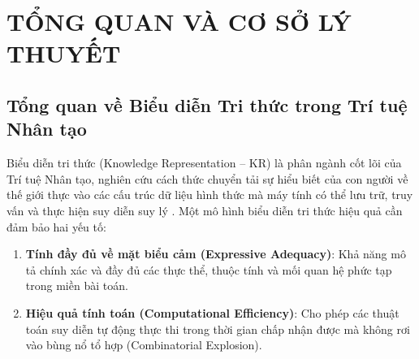 
\chapter{TỔNG QUAN VÀ CƠ SỞ LÝ THUYẾT}
\label{chap:overview}

\section{Tổng quan về Biểu diễn Tri thức trong Trí tuệ Nhân tạo}
Biểu diễn tri thức (Knowledge Representation -- KR) là phân ngành cốt lõi của Trí tuệ Nhân tạo, nghiên cứu cách thức chuyển tải sự hiểu biết của con người về thế giới thực vào các cấu trúc dữ liệu hình thức mà máy tính có thể lưu trữ, truy vấn và thực hiện suy diễn suy lý \cite{russell2020artificial, do2015bieudientrithuc}. Một mô hình biểu diễn tri thức hiệu quả cần đảm bảo hai yếu tố:
\begin{enumerate}
    \item \textbf{Tính đầy đủ về mặt biểu cảm (Expressive Adequacy)}: Khả năng mô tả chính xác và đầy đủ các thực thể, thuộc tính và mối quan hệ phức tạp trong miền bài toán.
    \item \textbf{Hiệu quả tính toán (Computational Efficiency)}: Cho phép các thuật toán suy diễn tự động thực thi trong thời gian chấp nhận được mà không rơi vào bùng nổ tổ hợp (Combinatorial Explosion).
\end{enumerate}


